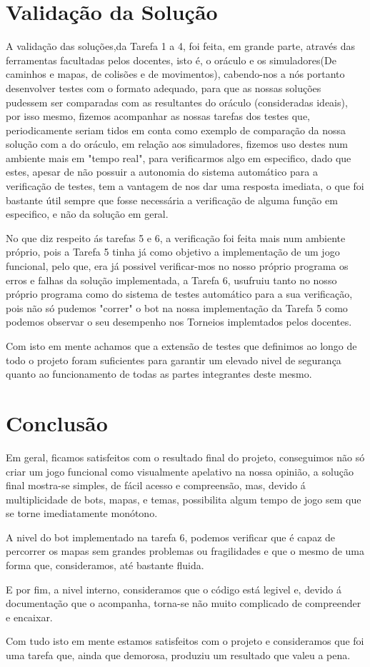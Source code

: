 \documentclass[a4paper]{report} %
\begin{document}
\chapter{Validação da Solução}

A validação das soluções,da Tarefa 1 a 4, foi feita, em grande parte, através das ferramentas facultadas pelos docentes, isto é, o oráculo e os simuladores(De caminhos e mapas, de colisões e de movimentos), cabendo-nos a nós portanto desenvolver testes com o formato adequado, para que as nossas soluções pudessem ser comparadas com as resultantes do oráculo (consideradas ideais), por isso mesmo, fizemos acompanhar as nossas tarefas dos testes que, periodicamente seriam tidos em conta como exemplo de comparação da nossa solução com a do oráculo, em relação aos simuladores, fizemos uso destes num ambiente mais em "tempo real", para verificarmos algo em especifico, dado que estes, apesar de não possuir a autonomia do sistema automático para a verificação de testes, tem a vantagem de nos dar uma resposta imediata, o que foi bastante útil sempre que fosse necessária a verificação de alguma função em especifico, e não da solução em geral.

No que diz respeito ás tarefas 5 e 6, a verificação foi feita mais num ambiente próprio, pois a Tarefa 5 tinha já como objetivo a implementação de um jogo funcional, pelo que, era já possivel verificar-mos no nosso próprio programa os erros e falhas da solução implementada, a Tarefa 6, usufruiu tanto no nosso próprio programa como do sistema de testes automático para a sua verificação, pois não só pudemos "correr" o bot na nossa implementação da Tarefa 5 como podemos observar o seu desempenho nos Torneios implemtados pelos docentes.

Com isto em mente achamos que a extensão de testes que definimos ao longo de todo o projeto foram 
suficientes para garantir um elevado nivel de segurança quanto ao funcionamento de todas as partes integrantes deste mesmo.
\chapter{Conclusão}
Em geral, ficamos satisfeitos com o resultado final do projeto, conseguimos não só criar um jogo funcional como visualmente apelativo na nossa opinião, a solução final mostra-se simples, de fácil acesso e compreensão, mas, devido á multiplicidade de bots, mapas, e temas, possibilita algum tempo de jogo sem que se torne imediatamente monótono.

A nivel do bot implementado na tarefa 6, podemos verificar que é capaz de percorrer os mapas sem grandes problemas ou fragilidades e que o mesmo de uma forma que, consideramos, até bastante fluida.

E por fim, a nivel interno, consideramos que o código está legivel e, devido á documentação que o acompanha, torna-se não muito complicado de compreender e encaixar.

Com tudo isto em mente estamos satisfeitos com o projeto e consideramos que foi uma tarefa que, ainda que demorosa, produziu um resultado que valeu a pena. 


    
\end{document}
